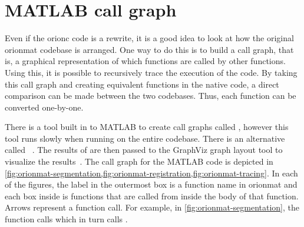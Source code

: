\section{ MATLAB call graph}\label{appx:matlab-call-graph}

Even if the \gls{orionc} code is a rewrite, it is a good idea to look at how
the original \gls{orionmat} codebase is arranged.  One way to do this is to
build a call graph, that is, a graphical representation of which functions are
called by other functions. Using this, it is possible to recursively trace the
execution of the code. By taking this call graph and creating equivalent
functions in the native code, a direct comparison can be made between the two
codebases. Thus, each function can be converted one-by-one.

There is a tool built in to MATLAB to create call graphs called
, %
however this tool runs slowly when running on the entire codebase.
There is an alternative called ~\autocite{MATLAB:fdep}. The
results of  are then passed to the GraphViz graph layout
tool to visualize the results~\autocite{GraphViz:Gansner:2000}.
The call graph for the MATLAB code is depicted in \cref{fig:orionmat-segmentation,fig:orionmat-registration,fig:orionmat-tracing}.
In each of the figures, the label in the outermost box is a function name in
\gls{orionmat} and each box inside is functions that are called from inside the
body of that function. Arrows represent a function call. For example, in
\cref{fig:orionmat-segmentation}, the 
function calls  which in turn calls
.

